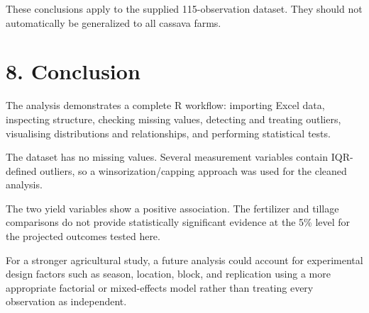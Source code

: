 \documentclass[
]{article}
\begin{document}
These conclusions apply to the supplied 115-observation dataset. They
should not automatically be generalized to all cassava farms.

\section{8. Conclusion}\label{conclusion}

The analysis demonstrates a complete R workflow: importing Excel data,
inspecting structure, checking missing values, detecting and treating
outliers, visualising distributions and relationships, and performing
statistical tests.

The dataset has no missing values. Several measurement variables contain
IQR-defined outliers, so a winsorization/capping approach was used for
the cleaned analysis.

The two yield variables show a positive association. The fertilizer and
tillage comparisons do not provide statistically significant evidence at
the 5\% level for the projected outcomes tested here.

For a stronger agricultural study, a future analysis could account for
experimental design factors such as season, location, block, and
replication using a more appropriate factorial or mixed-effects model
rather than treating every observation as independent.
\end{document}
